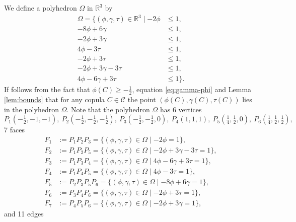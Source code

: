 \documentclass[12pt,a4paper]{amsart}
\theoremstyle{definition}
\newcommand{\RR}{\mathbb{R}}
\newcommand{\CC}{\mathcal{C}}
\begin{document}
We define a polyhedron $\Omega$ in $\RR^3$ by
\begin{align} 
   \Omega = \{(\phi, \gamma, \tau) \in \RR^3 \mid 
   -2\phi &\le 1, \nonumber\\
    - 8\phi + 6\gamma &\leq 1, \nonumber\\
   - 2\phi + 3\gamma &\leq 1, \nonumber\\
   4\phi-3\tau &\le 1, \label{eq:Omega}\\
   - 2\phi + 3\tau  &\le 1, \nonumber\\
   -2\phi+3\gamma-3\tau &\le 1, \nonumber\\ 
   4\phi-6\gamma + 3\tau &\le 1\}.\nonumber
\end{align}
If follows from the fact that $\phi(C) \ge -\tfrac12$, equation \eqref{eq:gamma-phi} and Lemma \ref{lem:bounds} that for any copula $C \in \CC$ the point $(\phi(C), \gamma(C), \tau(C))$ lies in the polyhedron $\Omega$. Note that the polyhedron $\Omega$ has 6 vertices
$$P_1(-\tfrac12,-1,-1),\ P_2(-\tfrac12,-\tfrac12,-\tfrac12),\ P_3(-\tfrac12,-\tfrac12,0),\ P_4(1,1,1),\ P_5(\tfrac14,\tfrac12,0),\ P_6(\tfrac14,\tfrac12,\tfrac12), $$
7 faces
\begin{align*}
  F_1 &:=  P_1 P_2 P_3 = \{ (\phi,\gamma, \tau) \in \Omega \mid -2\phi = 1 \}, \\
  F_2 &:=  P_1 P_2 P_5 = \{ (\phi,\gamma, \tau) \in \Omega \mid -2\phi+3\gamma-3\tau = 1 \}, \\
  F_3 &:=  P_1 P_3 P_4 = \{ (\phi,\gamma, \tau) \in \Omega \mid 4\phi-6\gamma + 3\tau = 1  \}, \\
  F_4 &:=  P_1 P_4 P_5 = \{ (\phi,\gamma, \tau) \in \Omega \mid 4\phi-3\tau = 1  \}, \\
  F_5 &:=  P_2 P_3 P_5 P_6 = \{ (\phi,\gamma, \tau) \in \Omega \mid - 8\phi + 6\gamma = 1  \}, \\
  F_6 &:=  P_3 P_4 P_6 = \{ (\phi,\gamma, \tau) \in \Omega \mid - 2\phi + 3\tau = 1  \}, \\
  F_7 &:=  P_4 P_5 P_6 = \{ (\phi,\gamma, \tau) \in \Omega \mid - 2\phi + 3\gamma = 1  \},
\end{align*}
and 11 edges
\end{document}
